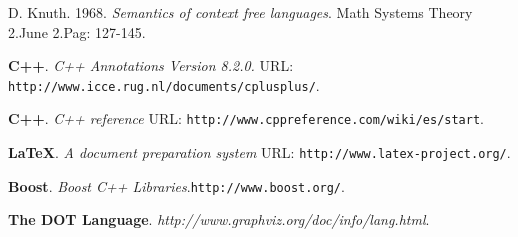 \begin{thebibliography}{10}
 D. Knuth. 1968. \textit{Semantics of context free languages}. Math Systems Theory 2.June 2.Pag: 127-145.


% 
% 

 \textbf{C++}. \textit{C++ Annotations Version 8.2.0.} URL: \texttt{http://www.icce.rug.nl/documents/cplusplus/}. 

 \textbf{C++}. \textit{C++ reference} URL: \texttt{http://www.cppreference.com/wiki/es/start}. 

 \textbf{\LaTeX}. \textit{A document preparation system} URL: \texttt{http://www.latex-project.org/}.

 \textbf{Boost}. \textit{Boost C++ Libraries}.\texttt{http://www.boost.org/}. 

 \textbf{The DOT Language}. \textit{http://www.graphviz.org/doc/info/lang.html}.
 
\end{thebibliography}



